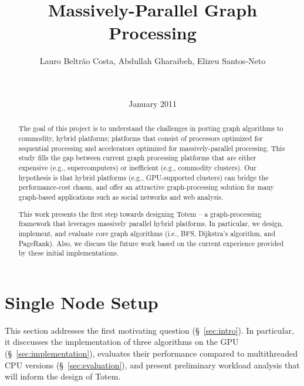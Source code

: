 \documentclass{acm_proc_article-sp}[12pt]
\title{Massively-Parallel Graph Processing}
\author{
\alignauthor 
Lauro Beltr\~ao Costa, Abdullah Gharaibeh, Elizeu
Santos-Neto\vspace{3mm}\\
       \affaddr{\small{University of British Columbia}}\\
       \affaddr{\small{2332 Main Mall, Vancouver, BC, CANADA}}\\
       \email{\small{\{lauroc,abdullah,elizeus\}@ece.ubc.ca}}
}
\date{ January 2011}
\newcommand{\comment}[2]{\begin{center}\colorbox{#1}{\parbox{0.85\linewidth}{\textit{{#2}}}}\end{center}}
\newcommand{\abdullah}[1]{\comment{orange}{{Abdullah: #1}}}
\newcommand{\lauro}[1]{\comment{midblue}{{Lauro: #1}}}
\newcommand{\elizeu}[1]{\comment{lightgreen}{{Elizeu: #1}}}
\begin{document}
\maketitle


\begin{abstract}
The goal of this project is to understand the challenges in porting graph algorithms to commodity, hybrid platforms; platforms that consist of processors optimized for sequential processing and accelerators optimized for massively-parallel processing. This study fills the gap between current graph processing platforms that are either expensive (e.g., supercomputers) or inefficient (e.g., commodity clusters). Our hypothesis is that hybrid platforms (e.g., GPU-supported clusters) can bridge the performance-cost chasm, and offer an attractive graph-processing solution for many graph-based applications such as social networks and web analysis.

This work presents the first step towards designing {\sc Totem} -- a graph-processing framework that leverages massively parallel hybrid platforms. In particular, we design, implement, and evaluate core graph algorithms (i.e., BFS, Dijkstra's algorithm, and PageRank). Also, we discuss the future work based on the current experience provided by these initial implementations.
\end{abstract}







\section{Single Node Setup}
\label{sec:single}

This section addresses the first motivating question (\S~\ref{sec:intro}). In particular, it disccusses the implementation of three algorithms on the GPU (\S~\ref{sec:implementation}), evaluates their performance compared to multithreaded CPU versions (\S~\ref{sec:evaluation}), and present preliminary workload analysis that will inform the design of {\sc Totem}.
\end{document}
